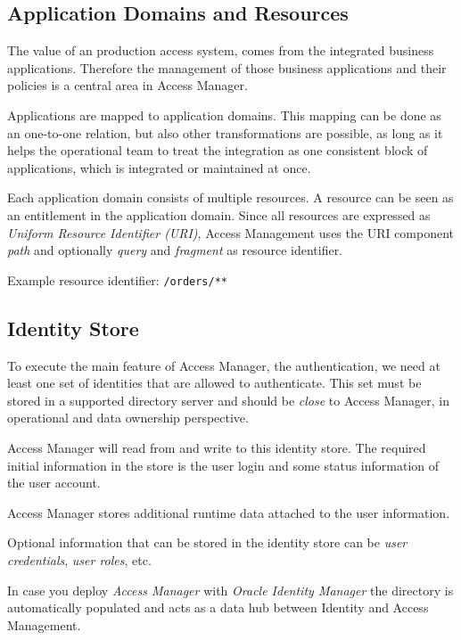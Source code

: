 \subsection{Application Domains and Resources}

The value of an production access system, comes from the integrated
business applications. Therefore the management of those business
applications and their policies is a central area in Access Manager.

Applications are mapped to application domains. This mapping can be done  
as an one-to-one relation, but also other transformations are possible,
as long as it helps the operational team to treat the integration as one
consistent block of applications, which is integrated or maintained at
once.

Each application domain consists of multiple resources. A resource can
be seen as an entitlement in the application domain. Since all resources
are expressed as \emph{Uniform Resource Identifier (URI)}, Access
Management uses the URI component \emph{path} and optionally \emph{query} and
\emph{fragment} as resource identifier.

Example resource identifier: \verb|/orders/**|



\subsection{Identity Store}

To execute the main feature of Access Manager, the authentication, we
need at least one set of identities that are allowed to authenticate.
This set must be stored in a supported directory server and should be
\emph{close} to Access Manager, in operational and data ownership
perspective.

Access Manager will read from and write to this identity store. The
required initial information in the store is the user login and some
status information of the user account.

Access Manager stores additional runtime data attached to the user
information.

Optional information that can be stored in the identity store can be
\emph{user credentials}, \emph{user roles}, etc.

In case you deploy \emph{Access Manager} with \emph{Oracle Identity
Manager} the directory is automatically populated and acts as a data hub
between Identity and Access Management.


